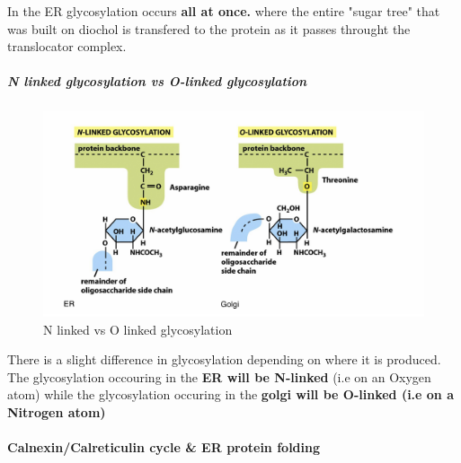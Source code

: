 \documentclass[../main.tex]{subfiles}
\begin{document}
In the ER glycosylation occurs \textbf{all at once.} where the entire "sugar tree" that was built on \gls{diochol} is transfered to the protein as it passes throught the translocator complex.


\subparagraph{N linked glycosylation vs O-linked glycosylation}
\begin{figure}[H]
    \centering
    \includegraphics[width=0.7\linewidth]{glycosylation.png}
    \caption{N linked vs O linked glycosylation}
    \label{fig:enter-label}
\end{figure}
There is a slight difference in glycosylation depending on where it is produced. The glycosylation occouring in the \textbf{ER will be N-linked} (i.e on an Oxygen atom) while the glycosylation occuring in the \textbf{golgi will be O-linked (i.e on a Nitrogen atom)}


\paragraph{Calnexin/Calreticulin cycle \& ER protein folding }
\end{document}
